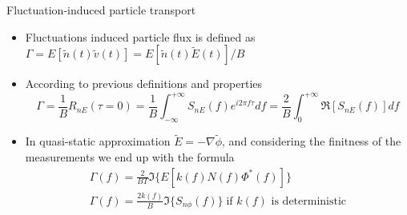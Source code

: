 \documentclass[t,10pt]{beamer}
\begin{document}
\begin{frame}{Fluctuation-induced particle transport}
\begin{itemize}
\item Fluctuations induced particle flux is defined as $\Gamma = E[\tilde{n}(t)\tilde{v}(t)]=E[\tilde{n}(t)\tilde{E}(t)]/B$
\item According to previous definitions and properties 
\begin{equation*}
\Gamma
=\frac{1}{B}R_{nE}(\tau=0)=\frac{1}{B}\int_{-\infty}^{+\infty}S_{nE}(f)e^{i2\pi
f\tau}df = \frac{2}{B}\int_0^{+\infty}\Re[S_{nE}(f)]df
\end{equation*}
\item In quasi-static approximation $\tilde{E}=-\nabla\tilde{\phi}$,
  and considering the finitness of the measurements we
  end up with the formula
\begin{eqnarray*}
\Gamma(f) = \frac{2}{BT}\Im\{ E[k(f)N(f)\Phi^{*}(f)]\} \\
\Gamma(f)=\frac{2k(f)}{B}\Im\{S_{n\phi}(f)\} \; \text{if $k(f)$ is deterministic}
\end{eqnarray*}
\end{itemize}
\end{frame}
\end{document}
